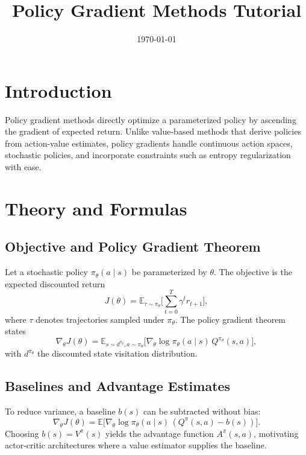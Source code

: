 ﻿\documentclass[12pt]{article}
\title{Policy Gradient Methods Tutorial}
\author{}
\date{\today}
\begin{document}
\maketitle

\section{Introduction}
Policy gradient methods directly optimize a parameterized policy by ascending the gradient of expected return. Unlike value-based methods that derive policies from action-value estimates, policy gradients handle continuous action spaces, stochastic policies, and incorporate constraints such as entropy regularization with ease.

\section{Theory and Formulas}
\subsection{Objective and Policy Gradient Theorem}
Let a stochastic policy \(\pi_\theta(a\mid s)\) be parameterized by \(\theta\). The objective is the expected discounted return
\begin{equation}
J(\theta) = \mathbb{E}_{\tau \sim \pi_\theta}\Big[ \sum_{t=0}^{T} \gamma^t r_{t+1} \Big],
\end{equation}
where \(\tau\) denotes trajectories sampled under \(\pi_\theta\). The policy gradient theorem states
\begin{equation}
\nabla_\theta J(\theta) = \mathbb{E}_{s \sim d^{\pi_\theta}, a \sim \pi_\theta}\big[ \nabla_\theta \log \pi_\theta(a\mid s)\, Q^{\pi_\theta}(s,a) \big],
\end{equation}
with \(d^{\pi_\theta}\) the discounted state visitation distribution.

\subsection{Baselines and Advantage Estimates}
To reduce variance, a baseline \(b(s)\) can be subtracted without bias:
\begin{equation}
\nabla_\theta J(\theta) = \mathbb{E}\big[ \nabla_\theta \log \pi_\theta(a\mid s)\, (Q^{\pi}(s,a) - b(s)) \big].
\end{equation}
Choosing \(b(s)=V^{\pi}(s)\) yields the advantage function \(A^{\pi}(s,a)\), motivating actor-critic architectures where a value estimator supplies the baseline.
\end{document}
